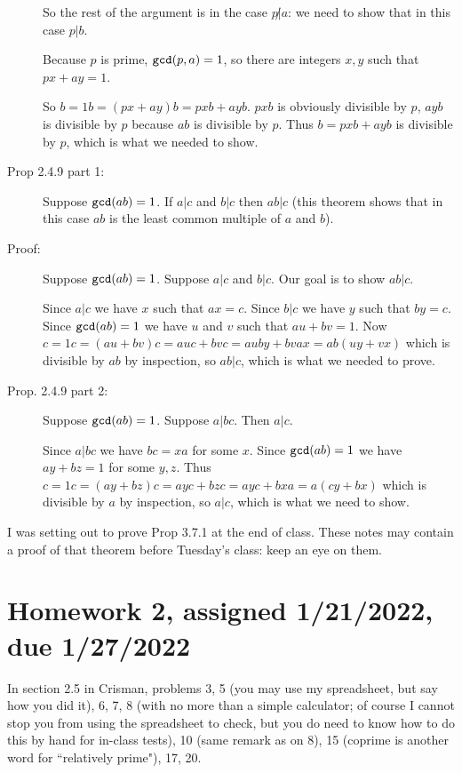 \documentclass[12pt]{article}
\begin{document}
\begin{description}
So the rest of the argument is in the case $p\not|a$:  we need to show that in this case $p|b$.

Because $p$ is prime, ${\tt gcd}(p,a)=1$, so there are integers $x,y$ such that $px+ay=1$.

So $b=1b=(px+ay)b = pxb + ayb$.  $pxb$ is obviously divisible by $p$,  $ayb$ is divisible by $p$ because $ab$ is divisible by $p$.
Thus $b=pxb +ayb$ is divisible by $p$, which is what we needed to show.

\item[Prop 2.4.9 part 1:]  Suppose ${\tt gcd}(ab) = 1$.  If $a|c$ and $b|c$ then $ab|c$ (this theorem shows that in this case $ab$ is the least common multiple of $a$ and $b$).

\item[Proof:]  Suppose ${\tt gcd}(ab) = 1$.  Suppose $a|c$ and $b|c$.  Our goal is to show $ab|c$.

Since $a|c$ we have $x$ such that $ax=c$.  Since $b|c$ we have $y$ such that $by=c$.  Since ${\tt gcd}(ab) = 1$ we have $u$ and $v$ such that $au+bv=1$.  Now $c=1c=(au+bv)c=auc + bvc= auby + bvax = ab(uy+vx)$ which is divisible by $ab$ by inspection, so $ab|c$, which is what we needed to prove.

\item[Prop. 2.4.9 part 2:]  Suppose ${\tt gcd}(ab) = 1$.  Suppose $a|bc$.  Then $a|c$.

Since $a|bc$ we have $bc=xa$ for some $x$.  Since ${\tt gcd}(ab) = 1$ we have $ay+bz=1$ for some $y,z$.  Thus $c=1c = (ay+bz)c=ayc+bzc=ayc +bxa=a(cy+bx)$ which is divisible by $a$ by inspection, so $a|c$, which is what we need to show.

\end{description}

I was setting out to prove Prop 3.7.1 at the end of class.  These notes may contain a proof of that theorem before Tuesday's class:  keep an eye on them.

\newpage

\section{Homework 2, assigned 1/21/2022, due 1/27/2022}

In section 2.5 in Crisman, problems 3, 5 (you may use my spreadsheet, but say how you did it), 6, 7, 8 (with no more than a simple calculator;  of course I cannot stop you from using the spreadsheet to check, but you do need to know how to do this by hand for in-class tests), 10 (same remark as on 8), 15 (coprime is another word for ``relatively prime"), 17, 20.
\end{document}

